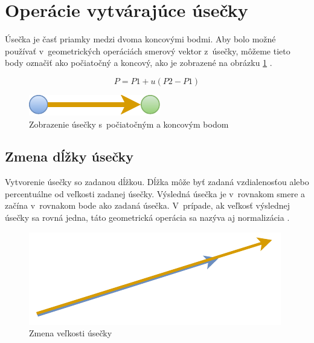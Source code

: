 \section{Operácie vytvárajúce úsečky}
Úsečka je časť priamky medzi dvoma koncovými bodmi. Aby bolo možné používať v~geometrických operáciách smerový vektor z~úsečky, môžeme tieto body označiť ako počiatočný a koncový, ako je zobrazené na obrázku \ref{fig:Navrh operacii-1D - Line} \cite{modernipocitacovagrafika}. 

\begin{equation}
    P = P1 + u(P2-P1)
    \label{eq:priamka}
\end{equation}

\begin{figure}[H]
	\centering
	\includegraphics[]{obrazky-figures/Diagram/Draw/2Line/DP Navrh operacii-1D - Line.pdf}
	\caption{Zobrazenie úsečky s~počiatočným a koncovým bodom}
	\label{fig:Navrh operacii-1D - Line}
\end{figure}


\subsection*{Zmena dĺžky úsečky}
Vytvorenie úsečky so zadanou dĺžkou. Dĺžka môže byť zadaná vzdialenosťou alebo percentuálne od veľkosti zadanej úsečky. Výsledná úsečka je v~rovnakom smere a začína v~rovnakom bode ako zadaná úsečka. V~prípade, ak veľkosť výslednej úsečky sa rovná jedna, táto geometrická operácia sa nazýva aj normalizácia \cite{modernipocitacovagrafika}.


\begin{figure}[H]
	\centering
	\includegraphics[]{obrazky-figures/Diagram/Draw/2Line/DP Navrh operacii-1D - LineChangeLength.pdf}
	\caption{Zmena veľkosti úsečky}
	\label{fig:LineChangeLength}
\end{figure}

